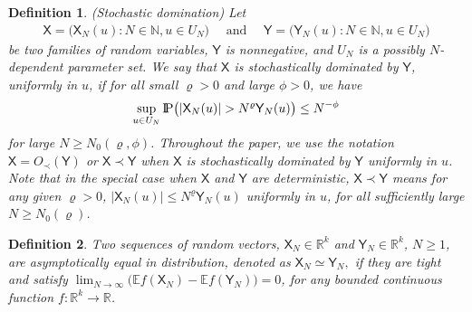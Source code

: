 \documentclass[12pt]{article}
\numberwithin{equation}{section}
\newtheorem{defin}{Definition}
\theoremstyle{remark}
\newcommand{\p}{{\rm I}\kern-0.18em{\rm P}}
\newcommand{\1}{{\rm 1}\kern-0.24em{\rm I}}
\begin{document}
\begin{defin}(Stochastic domination) \label{def.sd} Let
\begin{align*}
\mathsf{X}=\big(\mathsf{X}_N(u): N\in \mathbb{N}, u\in U_N\big) \quad \text{ and }\quad \mathsf{Y}=\big(\mathsf{Y}_N(u): N\in \mathbb{N}, u\in U_N\big)
\end{align*}
 be two families of random variables, $\mathsf{Y}$ is nonnegative, 
 and $U_N$ is a possibly $N$-dependent parameter set.  We say that $\mathsf{X}$ is stochastically dominated  by $\mathsf{Y}$, uniformly in $u$, if for all small $\varrho>0$ and large $\phi>0$, we have
 \begin{align*}
 \sup_{u\in U_N}\p\big(|\mathsf{X}_N(u)|>N^{\varrho}\mathsf{Y}_N(u)\big)\leq N^{-\phi}
 \end{align*}
 for large $N\geq N_0(\varrho, \phi)$. Throughout the paper, we use the notation $\mathsf{X}=O_\prec(\mathsf{Y})$ or $\mathsf{X}\prec \mathsf{Y}$ when $\mathsf{X}$ is stochastically dominated by $\mathsf{Y}$ uniformly in $u$.   Note that in the special case when $\mathsf{X}$ and $\mathsf{Y}$ are deterministic, $\mathsf{X}\prec \mathsf{Y}$
	means for any given $\varrho>0$,  $|\mathsf{X}_{N}(u)|\leq N^{\varrho}\mathsf{Y}_{N}(u)$ uniformly in $u$, for all sufficiently large $N\geq N_0(\varrho)$.

 
\end{defin}





\begin{defin} \label{defn_asymptotic}
Two sequences of random vectors, $\mathsf X_N \in \mathbb{R}^k$ and $\mathsf Y_N \in \mathbb{R}^k$, $N\geq 1$,  are \emph{asymptotically equal in distribution}, denoted as $\mathsf X_N \simeq \mathsf Y_N,$ if they are tight and satisfy
$
\lim_{N \rightarrow \infty} \big( \mathbb{E}f(\mathsf X_N)-\mathbb{E}f(\mathsf Y_N) \big)=0 
$, 
for any bounded continuous function $f:\mathbb{R}^k\to \mathbb{R}$. 
\end{defin}
\end{document}
